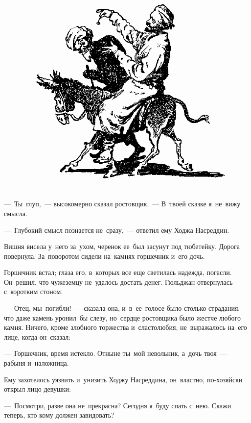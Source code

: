 \documentclass[12pt,a4paper]{book}
\begin{document}
\begin{figure}[h]
\centering
\includegraphics[width=\textwidth]{9.png}
\end{figure}

—~Ты~глуп,~— высокомерно сказал ростовщик.~— В~твоей сказке я~не~вижу смысла.

—~Глубокий смысл познается не~сразу,~— ответил ему Ходжа Насреддин.

Вишня висела у~него за~ухом, черенок ее~был засунут под тюбетейку. Дорога повернула. За~поворотом сидели на~камнях горшечник и~его дочь.

Горшечник встал; глаза его, в~которых все еще светилась надежда, погасли. Он~решил, что чужеземцу не~удалось достать денег. Гюльджан отвернулась с~коротким стоном.

—~Отец, мы~погибли!~— сказала она, и~в~ее~голосе было столько страдания, что даже камень уронил~бы слезу, но~сердце ростовщика было жестче любого камня. Ничего, кроме злобного торжества и~сластолюбия, не~выражалось на~его лице, когда он~сказал:

—~Горшечник, время истекло. Отныне ты~мой невольник, а~дочь твоя~— рабыня и~наложница.

Ему захотелось уязвить и~унизить Ходжу Насреддина, он~властно, по-хозяйски открыл лицо девушки:

—~Посмотри, разве она не~прекрасна? Сегодня я~буду спать с~нею. Скажи теперь, кто кому должен завидовать?
\end{document}
